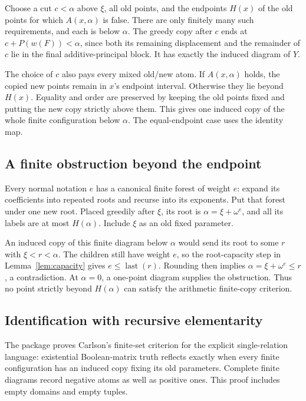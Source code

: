\documentclass[11pt]{article}
\begin{document}
Choose a cut $c<\alpha$ above $\xi$, all old points, and the endpoints
$H(x)$ of the old points for which $A(x,\alpha)$ is false. There are
only finitely many such requirements, and each is below $\alpha$.
The greedy copy after $c$ ends at $c+P(w(F))<\alpha$, since both
its remaining displacement and the remainder of $c$ lie in the final
additive-principal block. It has exactly the induced diagram of $Y$.

The choice of $c$ also pays every mixed old/new atom. If $A(x,\alpha)$
holds, the copied new points remain in $x$'s endpoint interval. Otherwise
they lie beyond $H(x)$. Equality and order are preserved by keeping the
old points fixed and putting the new copy strictly above them. This gives
one induced copy of the whole finite configuration below $\alpha$.
The equal-endpoint case uses the identity map.

\subsection{A finite obstruction beyond the endpoint}

Every normal notation $e$ has a canonical finite forest of weight $e$:
expand its coefficients into repeated roots and recurse into its
exponents. Put that forest under one new root. Placed greedily after
$\xi$, its root is $\alpha=\xi+\omega^e$, and all its labels are
at most $H(\alpha)$. Include $\xi$ as an old fixed parameter.

An induced copy of this finite diagram below $\alpha$ would send its
root to some $r$ with $\xi<r<\alpha$. The children still have weight
$e$, so the root-capacity step in Lemma~\ref{lem:capacity} gives
$e\leq\operatorname{last}(r)$. Rounding then implies
$\alpha=\xi+\omega^e\leq r$, a contradiction. At $\alpha=0$,
a one-point diagram supplies the obstruction. Thus no point strictly
beyond $H(\alpha)$ can satisfy the arithmetic finite-copy criterion.

\subsection{Identification with recursive elementarity}

The package proves Carlson's finite-set criterion
\cite[Proposition~1.2]{Carlson1999} for the explicit single-relation
language: existential Boolean-matrix truth reflects exactly when every
finite configuration has an induced copy fixing its old parameters.
Complete finite diagrams record negative atoms as well as positive ones.
This proof includes empty domains and empty tuples.
\end{document}
